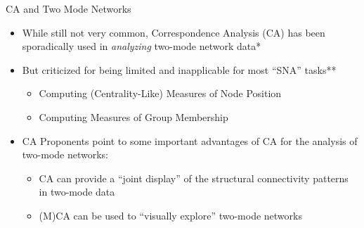 \documentclass[
  ignorenonframetext,
]{beamer}
\providecommand{\tightlist}{%
  \setlength{\itemsep}{0pt}\setlength{\parskip}{0pt}}\usepackage{longtable,booktabs,array}
\begin{document}
\begin{frame}{CA and Two Mode Networks}
\protect\hypertarget{ca-and-two-mode-networks-1}{}
\begin{itemize}
\tightlist
\item
  While still not very common, Correspondence Analysis (CA) has been
  sporadically used in \emph{analyzing} two-mode network data*
\item
  But criticized for being limited and inapplicable for most ``SNA''
  tasks**

  \begin{itemize}
  \tightlist
  \item
    Computing (Centrality-Like) Measures of Node Position
  \item
    Computing Measures of Group Membership
  \end{itemize}
\item
  CA Proponents point to some important advantages of CA for the
  analysis of two-mode networks:

  \begin{itemize}
  \tightlist
  \item
    CA can provide a ``joint display'' of the structural connectivity
    patterns in two-mode data
  \item
    (M)CA can be used to ``visually explore'' two-mode networks
  \end{itemize}
\end{itemize}

\end{frame}
\end{document}
